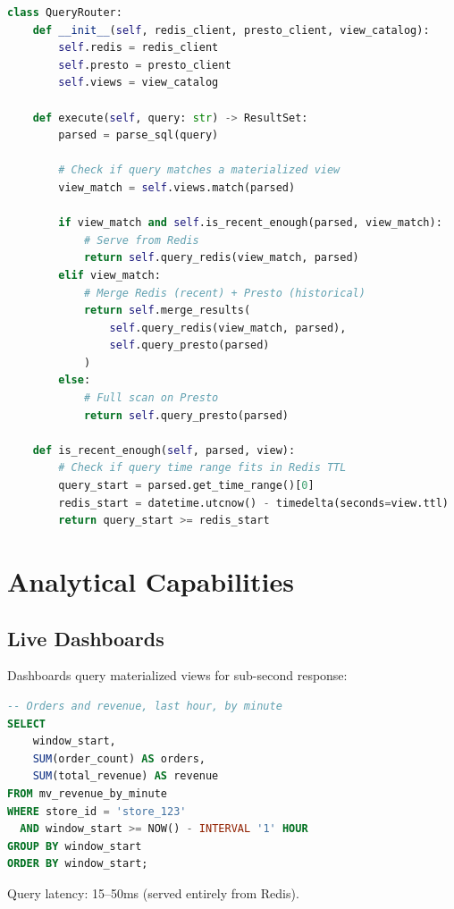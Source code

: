 \documentclass[11pt,twocolumn]{article}
\begin{document}
\begin{lstlisting}[language=Python,caption=Query routing]
class QueryRouter:
    def __init__(self, redis_client, presto_client, view_catalog):
        self.redis = redis_client
        self.presto = presto_client
        self.views = view_catalog

    def execute(self, query: str) -> ResultSet:
        parsed = parse_sql(query)

        # Check if query matches a materialized view
        view_match = self.views.match(parsed)

        if view_match and self.is_recent_enough(parsed, view_match):
            # Serve from Redis
            return self.query_redis(view_match, parsed)
        elif view_match:
            # Merge Redis (recent) + Presto (historical)
            return self.merge_results(
                self.query_redis(view_match, parsed),
                self.query_presto(parsed)
            )
        else:
            # Full scan on Presto
            return self.query_presto(parsed)

    def is_recent_enough(self, parsed, view):
        # Check if query time range fits in Redis TTL
        query_start = parsed.get_time_range()[0]
        redis_start = datetime.utcnow() - timedelta(seconds=view.ttl)
        return query_start >= redis_start
\end{lstlisting}

\section{Analytical Capabilities}

\subsection{Live Dashboards}

Dashboards query materialized views for sub-second response:

\begin{lstlisting}[language=SQL,caption=Dashboard query]
-- Orders and revenue, last hour, by minute
SELECT
    window_start,
    SUM(order_count) AS orders,
    SUM(total_revenue) AS revenue
FROM mv_revenue_by_minute
WHERE store_id = 'store_123'
  AND window_start >= NOW() - INTERVAL '1' HOUR
GROUP BY window_start
ORDER BY window_start;
\end{lstlisting}

Query latency: 15--50ms (served entirely from Redis).
\end{document}
